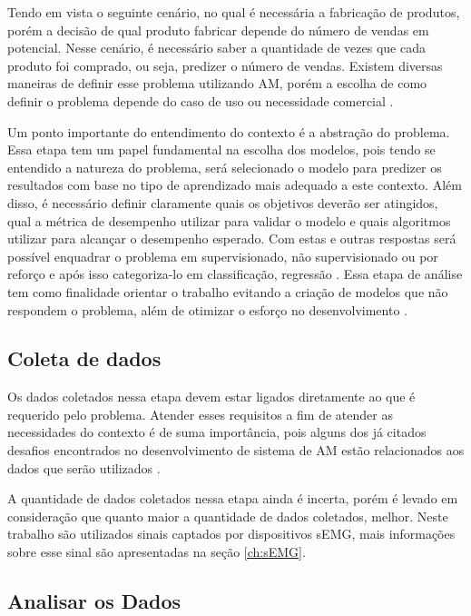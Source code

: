 Tendo em vista o seguinte cenário, no qual é necessária a fabricação de produtos, porém a decisão de qual produto fabricar depende do número de vendas em potencial. Nesse cenário, é necessário saber a quantidade de vezes que cada produto foi comprado, ou seja, predizer o número de vendas. Existem diversas maneiras de definir esse problema utilizando AM, porém a escolha de como definir o problema depende do caso de uso ou necessidade comercial \cite{Amazon}.

Um ponto importante do entendimento do contexto é a abstração do problema. Essa etapa tem um papel fundamental na escolha dos modelos, pois tendo se entendido a natureza do problema, será selecionado o modelo para predizer os resultados com base no tipo de aprendizado mais adequado a este contexto. Além disso, é necessário definir claramente quais os objetivos deverão ser atingidos, qual a métrica de desempenho utilizar para validar o modelo e quais algoritmos utilizar para alcançar o desempenho esperado. Com estas e outras respostas será possível enquadrar o problema em supervisionado, não supervisionado ou por reforço e após isso categoriza-lo em classificação, regressão \cite{geron2017hands}. Essa etapa de análise tem como finalidade orientar o trabalho evitando a criação de modelos que não respondem o problema, além de otimizar o esforço no desenvolvimento \cite{Amazon}.

\subsection{Coleta de dados}

Os dados coletados nessa etapa devem estar ligados diretamente ao que é requerido pelo problema. Atender esses requisitos a fim de atender as necessidades do contexto é de suma importância, pois alguns dos já citados desafios encontrados no desenvolvimento de sistema de AM estão relacionados aos dados que serão utilizados \cite{geron2017hands}.

A quantidade de dados coletados nessa etapa ainda é incerta, porém é levado em consideração que quanto maior a quantidade de dados coletados, melhor. Neste trabalho são utilizados sinais captados por dispositivos sEMG, mais informações sobre esse sinal são apresentadas na seção \ref{ch:sEMG}.

\subsection{Analisar os Dados}

